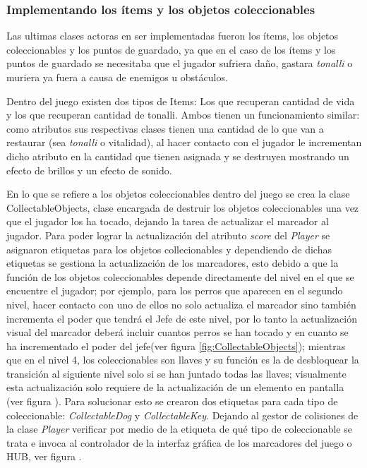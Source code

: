 \subsubsection{Implementando los ítems y los objetos coleccionables}
Las ultimas clases actoras en ser implementadas fueron los ítems, los objetos 
coleccionables y los puntos de guardado, ya que en el caso de los ítems y los 
puntos de guardado se necesitaba que el jugador sufriera daño, gastara 
\textit{tonalli} o muriera ya fuera a causa de enemigos u obstáculos. 
\\
\par
Dentro del juego existen dos tipos de Items: Los que recuperan cantidad de vida y 
los que recuperan cantidad de tonalli. Ambos tienen un funcionamiento similar: como 
atributos sus respectivas clases tienen una cantidad de lo que van a restaurar 
(sea \textit{tonalli} o vitalidad), al hacer contacto con el jugador le incrementan 
dicho atributo en la cantidad que tienen asignada y se destruyen mostrando un 
efecto de brillos y un efecto de sonido. 
\\
\par
En lo que se refiere a los objetos coleccionables dentro del juego se crea la 
clase CollectableObjects, clase encargada de destruir los objetos coleccionables 
una vez que el jugador los ha tocado, dejando la tarea de actualizar el marcador 
al jugador. Para poder lograr la actualización del atributo \textit{score} del 
\textit{Player} se asignaron etiquetas para los objetos collecionables y dependiendo 
de dichas etiquetas se gestiona la actualización de los marcadores, esto debido a que 
la función de los objetos coleccionables depende directamente del nivel en el que 
se encuentre el jugador; por ejemplo, para los perros que aparecen en el segundo 
nivel, hacer contacto con uno de ellos no solo actualiza el marcador sino también 
incrementa el poder que tendrá el Jefe de este nivel, por lo tanto 
la actualización visual del marcador deberá incluir cuantos perros se han tocado 
y en cuanto se ha incrementado el poder del jefe(ver figura 
\ref{fig:CollectableObjects}); mientras que en el nivel 4, los coleccionables 
son llaves y su función es la de desbloquear la transición al siguiente nivel 
solo si se han juntado todas las llaves; visualmente esta actualización solo 
requiere de la actualización de un elemento en pantalla (ver figura ). Para solucionar esto se crearon dos etiquetas para cada tipo de coleccionable: \textit{CollectableDog} y \textit{CollectableKey}.  Dejando al gestor de colisiones de la clase \textit{Player} verificar por medio de la etiqueta de qué tipo de coleccionable se trata e invoca al controlador de la interfaz gráfica de los marcadores del juego o HUB, ver figura .
			
